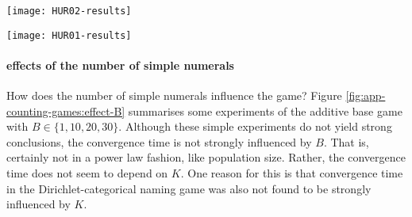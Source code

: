 \documentclass{../src/bcthesispart}
\begin{document}
\begin{SCfigure}
	\texttt{[image: HUR02-results]}	
	\caption{Effects of $\xi$, the parameter regulating the production strategy in the additive base game. Clearly, smaller values lead to slower convergence time.
		\label{fig:app-counting-games:effects-xi}}
\end{SCfigure}


\begin{SCfigure}
	\texttt{[image: HUR01-results]}	
	\caption{The effect of $K$, the number of bases, in the additive base game. 
		\label{fig:app-counting-games:effect-B}}
\end{SCfigure}




\paragraph{effects of the number of simple numerals}

How does the number of simple numerals influence the game?
Figure \ref{fig:app-counting-games:effect-B} summarises some experiments of the additive base game with $B \in \{1,10,20,30\}$.
Although these simple experiments do not yield strong conclusions, the convergence time is not strongly influenced by $B$.
That is, certainly not in a power law fashion, like population size.
Rather, the convergence time does not seem to depend on $K$.
One reason for this is that convergence time in the Dirichlet-categorical naming game was also not found to be strongly influenced by $K$.



\showbibliography
\end{document}
